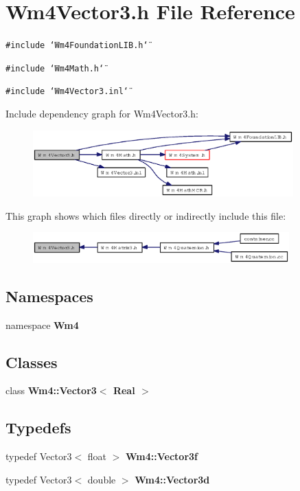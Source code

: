 \section{Wm4Vector3.h File Reference}
\label{Wm4Vector3_8h}
{\tt \#include \char`\"{}Wm4Foundation\-LIB.h\char`\"{}}\par
{\tt \#include \char`\"{}Wm4Math.h\char`\"{}}\par
{\tt \#include \char`\"{}Wm4Vector3.inl\char`\"{}}\par


Include dependency graph for Wm4Vector3.h:\begin{figure}[H]
\begin{center}
\leavevmode
\includegraphics[width=284pt]{Wm4Vector3_8h__incl}
\end{center}
\end{figure}


This graph shows which files directly or indirectly include this file:\begin{figure}[H]
\begin{center}
\leavevmode
\includegraphics[width=280pt]{Wm4Vector3_8h__dep__incl}
\end{center}
\end{figure}
\subsection*{Namespaces}
\begin{CompactItemize}
\item 
namespace {\bf Wm4}
\end{CompactItemize}
\subsection*{Classes}
\begin{CompactItemize}
\item 
class {\bf Wm4::Vector3$<$ Real $>$}
\end{CompactItemize}
\subsection*{Typedefs}
\begin{CompactItemize}
\item 
typedef Vector3$<$ float $>$ {\bf Wm4::Vector3f}
\item 
typedef Vector3$<$ double $>$ {\bf Wm4::Vector3d}
\end{CompactItemize}
